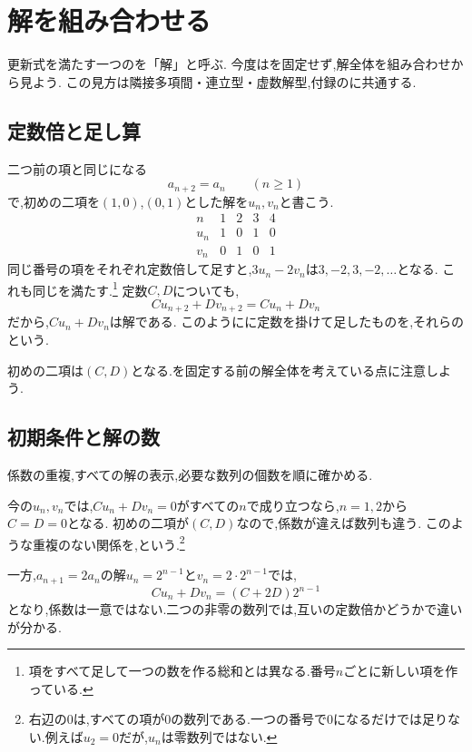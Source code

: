 
\section{解を組み合わせる}\label{節：解を組み合わせる}
更新式を満たす一つのを「解」と呼ぶ.
今度はを固定せず,解全体を組み合わせから見よう.
この見方は隣接多項間・連立型・虚数解型,付録のに共通する.

\subsection{定数倍と足し算}\label{節：定数倍と足し算}
二つ前の項と同じになる
\[
  a_{n+2}=a_n\qquad(n\ge1)
\]
で,初めの二項を$(1,0)$,$(0,1)$とした解を$u_n,v_n$と書こう.
\[
  \begin{array}{c|rrrr}
    n&1&2&3&4\\ \hline
    u_n&1&0&1&0\\
    v_n&0&1&0&1
  \end{array}
\]
同じ番号の項をそれぞれ定数倍して足すと,$3u_n-2v_n$は$3,-2,3,-2,\ldots$となる.
これも同じを満たす.\footnote{項をすべて足して一つの数を作る総和とは異なる.番号$n$ごとに新しい項を作っている.}
定数$C,D$についても,
\[
  Cu_{n+2}+Dv_{n+2}=Cu_n+Dv_n
\]
だから,$Cu_n+Dv_n$は解である.
このようにに定数を掛けて足したものを,それらの\textbf{}という.

初めの二項は$(C,D)$となる.を固定する前の解全体を考えている点に注意しよう.

\subsection{初期条件と解の数}\label{節：初期条件と解の数}
係数の重複,すべての解の表示,必要な数列の個数を順に確かめる.

今の$u_n,v_n$では,$Cu_n+Dv_n=0$がすべての$n$で成り立つなら,$n=1,2$から$C=D=0$となる.
初めの二項が$(C,D)$なので,係数が違えば数列も違う.
このような重複のない関係を,\textbf{}という.\footnote{右辺の$0$は,すべての項が$0$の数列である.一つの番号で$0$になるだけでは足りない.例えば$u_2=0$だが,$u_n$は零数列ではない.}

一方,$a_{n+1}=2a_n$の解$u_n=2^{n-1}$と$v_n=2\cdot2^{n-1}$では,
\[
  Cu_n+Dv_n=(C+2D)2^{n-1}
\]
となり,係数は一意ではない.二つの非零の数列では,互いの定数倍かどうかで違いが分かる.

